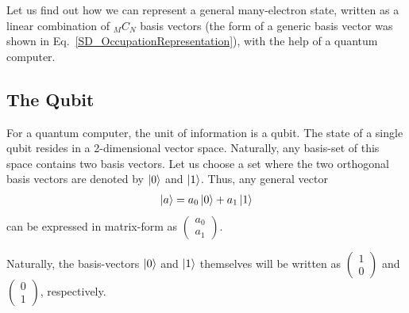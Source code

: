 \documentclass[12pt,oneside]{book}
\begin{document}
Let us find out how we can represent a general many-electron state, written as a linear combination of $_MC_N$ basis vectors (the form of a generic basis vector was shown in Eq.~\ref{SD_OccupationRepresentation}), with the help of a quantum computer. %




    
    

\subsection*{The Qubit}

For a quantum computer, the unit of information is a qubit. The state of a single qubit resides in a 2-dimensional vector space. Naturally, any basis-set of this space contains two basis vectors. Let us choose a set where the two orthogonal basis vectors are denoted by $\ket{0}$ and $\ket{1}$. Thus, any general vector 
\begin{align}\label{Eq1}
    \ket{a}=a_0\ket{0}+a_1\ket{1}
\end{align}
can be expressed in matrix-form as $\begin{pmatrix}
        a_0\\
        a_1
    \end{pmatrix}$.

Naturally, the basis-vectors $\ket{0}$ and $\ket{1}$ themselves will be written as
$\begin{pmatrix}
        1\\
        0
    \end{pmatrix}$ and $\begin{pmatrix}
        0\\
        1
    \end{pmatrix}$, respectively.
\end{document}
